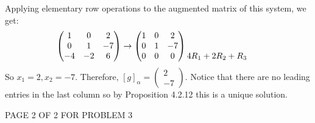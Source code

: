 \documentclass[12pt]{article}
\newenvironment{problem}[2][Problem]
{
	\begin{trivlist} 
		\item[\hskip \labelsep {\bfseries #1 #2:}]
	}
{
	\end{trivlist}
	}
\newenvironment{solution}[1][Solution]
{
	\begin{trivlist} 
		\item[\hskip \labelsep {\itshape #1:}]
	}
	{
	\end{trivlist}
}
\begin{document}
\begin{problem}{5}
\begin{solution}
Applying elementary row operations to the augmented matrix of this system, we get:
\begin{align*}
\begin{pmatrix} 1&0&2\\0&1&-7\\-4&-2&6 \end{pmatrix} &\rightarrow \begin{pmatrix} 1&0&2\\0&1&-7\\0&0&0 \end{pmatrix} \begin{matrix} \hphantom{1} \\ \hphantom{1} \\ 4R_1+2R_2+R_3\hphantom{1} \end{matrix}
\end{align*}
So $x_1 = 2, x_2=-7$. Therefore, $[g]_{\alpha} = \begin{pmatrix} 2\\-7\end{pmatrix}$. Notice that there are no leading entries in the last column so by Proposition 4.2.12 this is a unique solution.
\end{solution}
\vfill
\centerline{PAGE 2 OF 2 FOR PROBLEM 3}


\end{problem}
\end{document}
